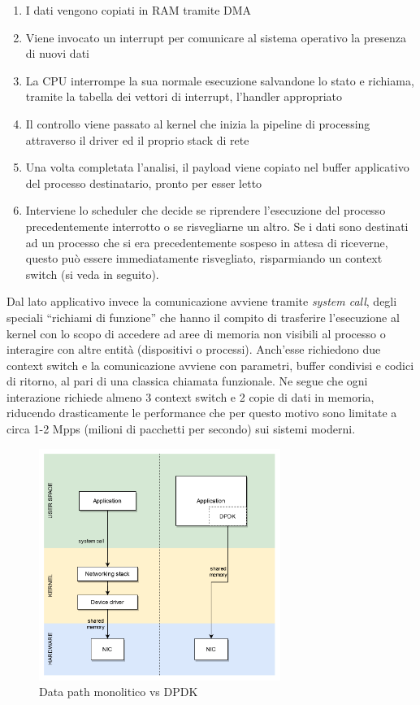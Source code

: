 \begin{enumerate}
  \item I dati vengono copiati in RAM tramite DMA
  \item Viene invocato un interrupt per comunicare al sistema operativo la presenza di nuovi dati
  \item La CPU interrompe la sua normale esecuzione salvandone lo stato e richiama, tramite la tabella dei vettori di interrupt, l'handler appropriato
  \item Il controllo viene passato al kernel che inizia la pipeline di processing attraverso il driver ed il proprio stack di rete
  \item Una volta completata l'analisi, il payload viene copiato nel buffer applicativo del processo destinatario, pronto per esser letto
  \item Interviene lo scheduler che decide se riprendere l'esecuzione del processo precedentemente interrotto o se risvegliarne un altro. Se i dati sono destinati ad un processo che si era precedentemente sospeso in attesa di riceverne, questo può essere immediatamente risvegliato, risparmiando un context switch (si veda in seguito).
\end{enumerate}

Dal lato applicativo invece la comunicazione avviene tramite \textit{system call}, degli speciali ``richiami di funzione'' che hanno il compito di trasferire l'esecuzione al kernel con lo scopo di accedere ad aree di memoria non visibili al processo o interagire con altre entità (dispositivi o processi). Anch'esse richiedono due context switch e la comunicazione avviene con parametri, buffer condivisi e codici di ritorno, al pari di una classica chiamata funzionale. Ne segue che ogni interazione richiede almeno 3 context switch e 2 copie di dati in memoria, riducendo drasticamente le performance che per questo motivo sono limitate a circa 1-2 Mpps (milioni di pacchetti per secondo) sui sistemi moderni.

\begin{figure}[htb]
    \includegraphics[width=0.7\textwidth]{graphics/trad-vs-dpdk.png}
    \caption{Data path monolitico vs DPDK}
    \label{fig:trad-vs-dpdk}
\end{figure}

